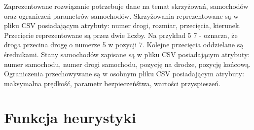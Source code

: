 Zaprezentowane rozwiązanie potrzebuje dane na temat skrzyżowań, samochodów oraz ograniczeń parametrów samochodów. Skrzyżowania reprezentowane są w pliku CSV posiadającym atrybuty: numer drogi, rozmiar, przecięcia, kierunek. Przecięcie reprezentowane są przez dwie liczby. Na przykład 5 7 - oznacza, że droga przecina drogę o numerze 5 w pozycji 7. Kolejne przecięcia oddzielane są średnikami. Stany samochodów zapisane są w pliku CSV posiadającym atrybuty: numer samochodu, numer drogi samochodu, pozycję na drodze, pozycję końcową. Ograniczenia przechowywane są w osobnym pliku CSV posiadającym atrybuty: maksymalna prędkość, parametr bezpieczeńśtwa, wartości przyspieszeń.

\section{Funkcja heurystyki}

